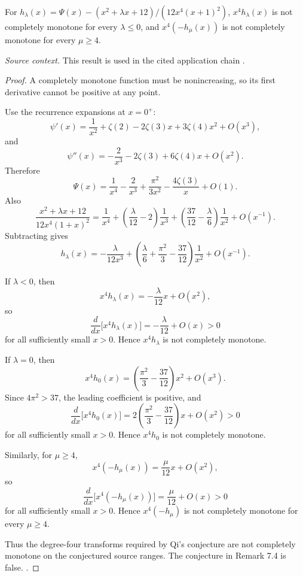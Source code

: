 \begin{counterexample}
\label{res:qi-hlambda-x4-source-range-not-cm}
For \(h_\lambda(x)=\Psi(x)-(x^2+\lambda x+12)/(12x^4(x+1)^2)\), \(x^4h_\lambda(x)\) is not completely monotone for every \(\lambda\le0\), and \(x^4(-h_\mu(x))\) is not completely monotone for every \(\mu\ge4\).

\emph{Source context.} This result is used in the cited application chain \cite{qi-hlambda}.
\end{counterexample}
\begin{proof}
A completely monotone function must be nonincreasing, so its first derivative cannot be positive at any point.

Use the recurrence expansions at \(x=0^+\):
\[
\psi'(x)=\frac1{x^2}+\zeta(2)-2\zeta(3)x+3\zeta(4)x^2+O(x^3),
\]
and
\[
\psi''(x)=-\frac2{x^3}-2\zeta(3)+6\zeta(4)x+O(x^2).
\]
Therefore
\[
\Psi(x)
=\frac1{x^4}-\frac2{x^3}+\frac{\pi^2}{3x^2}
-\frac{4\zeta(3)}x+O(1).
\]
Also
\[
\frac{x^2+\lambda x+12}{12x^4(1+x)^2}
=\frac1{x^4}+\left(\frac{\lambda}{12}-2\right)\frac1{x^3}
+\left(\frac{37}{12}-\frac{\lambda}{6}\right)\frac1{x^2}
+O(x^{-1}).
\]
Subtracting gives
\[
h_\lambda(x)
=-\frac{\lambda}{12x^3}
+\left(\frac{\lambda}{6}+\frac{\pi^2}{3}-\frac{37}{12}\right)\frac1{x^2}
+O(x^{-1}).
\]

If \(\lambda<0\), then
\[
x^4h_\lambda(x)=-\frac{\lambda}{12}x+O(x^2),
\]
so
\[
\frac{d}{dx}\bigl[x^4h_\lambda(x)\bigr]
=-\frac{\lambda}{12}+O(x)>0
\]
for all sufficiently small \(x>0\). Hence \(x^4h_\lambda\) is not completely monotone.

If \(\lambda=0\), then
\[
x^4h_0(x)
=\left(\frac{\pi^2}{3}-\frac{37}{12}\right)x^2+O(x^3).
\]
Since \(4\pi^2>37\), the leading coefficient is positive, and
\[
\frac{d}{dx}\bigl[x^4h_0(x)\bigr]
=2\left(\frac{\pi^2}{3}-\frac{37}{12}\right)x+O(x^2)>0
\]
for all sufficiently small \(x>0\). Hence \(x^4h_0\) is not completely monotone.

Similarly, for \(\mu\ge4\),
\[
x^4(-h_\mu(x))=\frac{\mu}{12}x+O(x^2),
\]
so
\[
\frac{d}{dx}\bigl[x^4(-h_\mu(x))\bigr]
=\frac{\mu}{12}+O(x)>0
\]
for all sufficiently small \(x>0\). Hence \(x^4(-h_\mu)\) is not completely monotone for every \(\mu\ge4\).

Thus the degree-four transforms required by Qi's conjecture are not completely monotone on the conjectured source ranges. The conjecture in Remark 7.4 is false. \cite{qi-hlambda}.
\end{proof}

